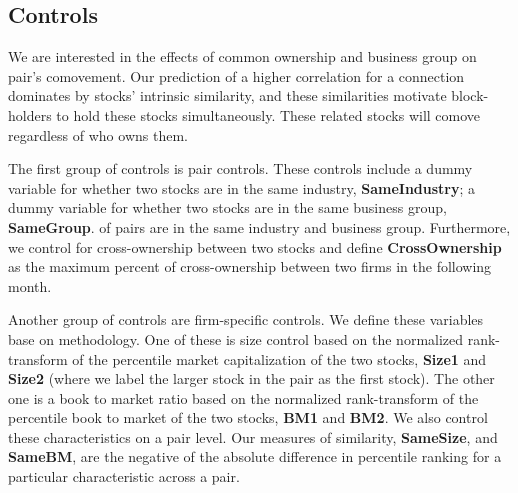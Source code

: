 	
%			



\FloatBarrier


\subsection{Controls}

We are interested in the effects of common ownership and business group on pair's comovement.
Our prediction of a higher correlation for a connection dominates by stocks' intrinsic similarity, and these similarities motivate block-holders to hold these stocks simultaneously. These related stocks will comove regardless of who owns them.

The first group of controls is pair controls. These controls include
a dummy variable for whether two stocks are in the same industry, \textbf{SameIndustry}; a dummy variable for whether two stocks are in the same business group, \textbf{SameGroup}.
of pairs are in the same industry and business group. Furthermore, we control for cross-ownership between two stocks and define  \textbf{CrossOwnership} as the maximum percent of cross-ownership between two firms in the following month.


%				


Another group of controls are firm-specific controls.  We define these variables base on  \cite{AntonPolk} methodology. One of these is size control based on the normalized rank-transform of the percentile market capitalization of the two stocks, \textbf{Size1} and \textbf{Size2} (where we label the
larger stock in the pair as the first stock). The other one is a book to market ratio based on the normalized rank-transform of the percentile book to market of the two stocks, \textbf{BM1} and \textbf{BM2}.
We also control these characteristics on a pair level. Our measures of similarity, \textbf{SameSize}, and \textbf{SameBM}, are the negative of the absolute difference in percentile ranking for a particular characteristic across a pair.


